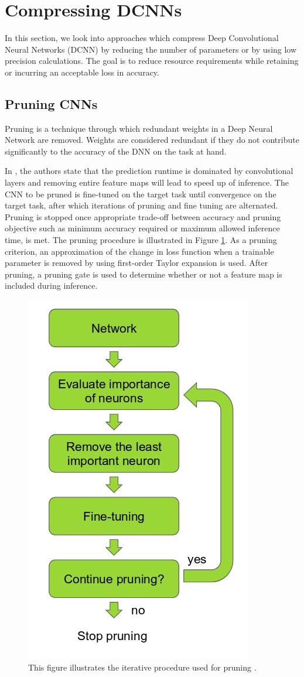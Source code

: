 \section{Compressing DCNNs}
\label{section:compress}

In this section, we look into approaches which compress Deep Convolutional Neural Networks (DCNN) by reducing the number of parameters or by using low precision calculations. The goal is to reduce resource requirements while retaining or incurring an acceptable loss in accuracy. 

\subsection{Pruning CNNs}

Pruning is a technique through which redundant weights in a Deep Neural Network are removed. Weights are considered redundant if they do not contribute significantly to the accuracy of the DNN on the task at hand. 

In \cite{DBLP:journals/corr/MolchanovTKAK16}, the authors state that the prediction runtime is dominated by convolutional layers and removing entire feature maps will lead to speed up of inference. The CNN to be pruned is fine-tuned on the target task until convergence on the target task, after which iterations of pruning and fine tuning are alternated. Pruning is stopped once appropriate trade-off between accuracy and pruning objective such as minimum accuracy required or maximum allowed inference time, is met. The pruning procedure is illustrated in Figure \ref{Fig:prune}. As a pruning criterion, an approximation of the change in loss function when a trainable parameter is removed by using first-order Taylor expansion is used. After pruning, a pruning gate is used to determine whether or not a feature map is included during inference.

	\begin{figure}[h]
		\centering
		\includegraphics[width=.3\linewidth]{images/pruning_rei}
		\caption{This figure illustrates the iterative procedure used for pruning \cite{DBLP:journals/corr/MolchanovTKAK16}.}
		\label{Fig:prune}
	\end{figure}

